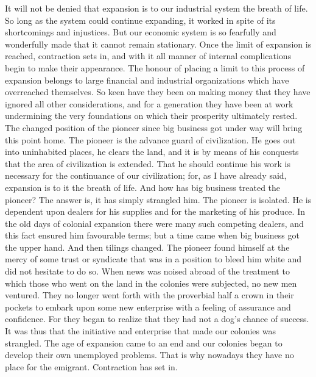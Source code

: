 \documentclass{book}
\begin{document}
It will not be denied that expansion is to our industrial system the breath of life. So long as the system could continue expanding, it worked in spite of its shortcomings and injustices. But our economic system is so fearfully and wonderfully made that it cannot remain stationary. Once the limit of expansion is reached, contraction sets in, and with it all manner of internal complications begin to make their appearance. The honour of placing a limit to this process of expansion belongs to large financial and industrial organizations which have overreached themselves. So keen have they been on making money that they have ignored all other considerations, and for a generation they have been at work undermining the very foundations on which their prosperity ultimately rested. The changed position of the pioneer since big business got under way will bring this point home. The pioneer is the advance guard of civilization. He goes out into uninhabited places, he clears the land, and it is by means of his conquests that the area of civilization is extended. That he should continue his work is necessary for the continuance of our civilization; for, as I have already said, expansion is to it the breath of life. And how has big business treated the pioneer? The answer is, it has simply strangled him. The pioneer is isolated. He is dependent upon dealers for his supplies and for the marketing of his produce. In the old days of colonial expansion there were many such competing dealers, and this fact ensured him favourable terms; but a time came when big business got the upper hand. And then tilings changed. The pioneer found himself at the mercy of some trust or syndicate that was in a position to bleed him white and did not hesitate to do so. When news was noised abroad of the treatment to which those who went on the land in the colonies were subjected, no new men ventured. They no longer went forth with the proverbial half a crown in their pockets to embark upon some new enterprise with a feeling of assurance and confidence. For they began to realize that they had not a dog’s chance of success. It was thus that the initiative and enterprise that made our colonies was strangled. The age of expansion came to an end and our colonies began to develop their own unemployed problems. That is why nowadays they have no place for the emigrant. Contraction has set in.
\end{document}
